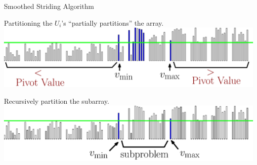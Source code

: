 \documentclass[xcolor=x11names, svgnames, rgb]{beamer}
\begin{document}
\begin{frame}[t]{Smoothed Striding Algorithm}

  {\color{blue}Partitioning the $U_i$'s ``partially partitions''
the array.}
  \includegraphics[width=\linewidth]{imgs/smoothedStridingAlgSim/sim4.eps}

  \vspace{0.5cm}
  {\color{blue}Recursively partition the subarray.}
  \includegraphics[width=\linewidth]{imgs/smoothedStridingAlgSim/sim45.eps}
\end{frame}
\end{document}
